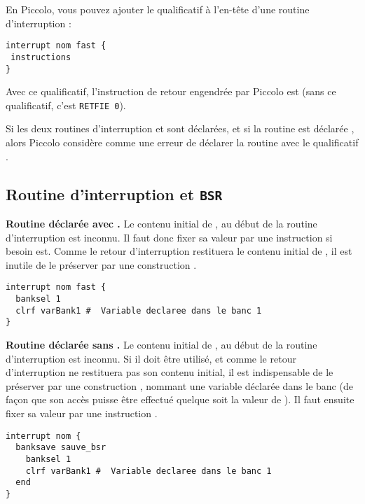 En Piccolo, vous pouvez ajouter le qualificatif  à l’en-tête d’une routine d’interruption :

\begin{lstlisting}[language=piccolo]
interrupt nom fast {
 instructions
}
\end{lstlisting}

Avec ce qualificatif, l’instruction de retour engendrée par Piccolo est  (sans ce qualificatif, c’est \texttt{RETFIE 0}).

Si les deux routines d’interruption  et  sont déclarées, et si la routine  est déclarée , alors Piccolo considère comme une erreur de déclarer la routine  avec le qualificatif .






\subsection{Routine d'interruption et \texttt{BSR}}

\textbf{Routine déclarée avec .} Le contenu initial de , au début de la routine d’interruption est inconnu. Il faut donc fixer sa valeur par une instruction  si besoin est. Comme le retour d’interruption restituera le contenu initial de , il est inutile de le préserver par une construction .

\begin{lstlisting}[language=piccolo]
interrupt nom fast {
  banksel 1
  clrf varBank1 #  Variable declaree dans le banc 1
}
\end{lstlisting}

\textbf{Routine déclarée sans .} Le contenu initial de , au début de la routine d’interruption est inconnu. Si il doit être utilisé, et comme le retour d’interruption ne restituera pas son contenu initial, il est indispensable de le préserver par une construction , nommant une variable  déclarée dans le banc  (de façon que son accès puisse être effectué quelque soit la valeur de ). Il faut ensuite fixer sa valeur par une instruction . 

\begin{lstlisting}[language=piccolo]
interrupt nom {
  banksave sauve_bsr
    banksel 1
    clrf varBank1 #  Variable declaree dans le banc 1
  end
}
\end{lstlisting}

